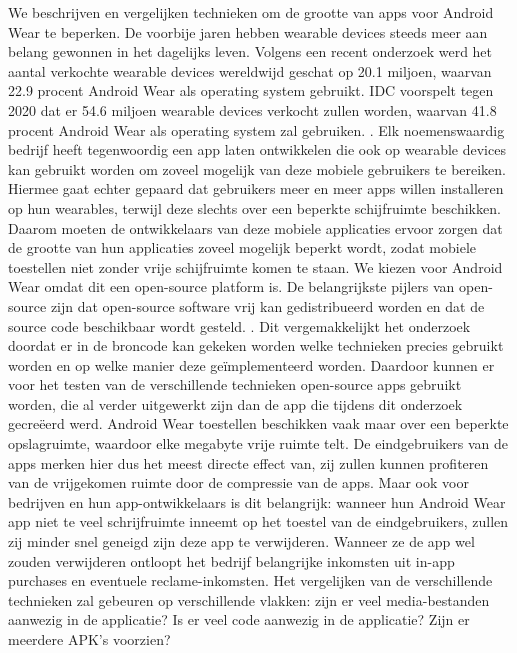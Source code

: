 We beschrijven en vergelijken technieken om de grootte van apps voor Android Wear te beperken. De voorbije jaren hebben wearable devices steeds meer aan belang gewonnen in het dagelijks leven. Volgens een recent onderzoek werd het aantal verkochte wearable devices wereldwijd geschat op 20.1 miljoen, waarvan 22.9 procent Android Wear als operating system gebruikt. IDC voorspelt tegen 2020 dat er 54.6 miljoen wearable devices verkocht zullen worden, waarvan 41.8 procent Android Wear als operating system zal gebruiken. \autocite{IDC}. Elk noemenswaardig bedrijf heeft tegenwoordig een app laten ontwikkelen die ook op wearable devices kan gebruikt worden om zoveel mogelijk van deze mobiele gebruikers te bereiken. Hiermee gaat echter gepaard dat gebruikers meer en meer apps willen installeren op hun wearables, terwijl deze slechts over een beperkte schijfruimte beschikken. Daarom moeten de ontwikkelaars van deze mobiele applicaties ervoor zorgen dat de grootte van hun applicaties zoveel mogelijk beperkt wordt, zodat mobiele toestellen niet zonder vrije schijfruimte komen te staan. We kiezen voor Android Wear omdat dit een open-source platform is. De belangrijkste pijlers van open-source zijn dat open-source software vrij kan gedistribueerd worden en dat de source code beschikbaar wordt gesteld. \autocite{OpenSourceInitiative}. Dit vergemakkelijkt het onderzoek doordat er in de broncode kan gekeken worden welke technieken precies gebruikt worden en op welke manier deze geïmplementeerd worden. Daardoor kunnen er voor het testen van de verschillende technieken open-source apps gebruikt worden, die al verder uitgewerkt zijn dan de app die tijdens dit onderzoek gecreëerd werd. Android Wear toestellen beschikken vaak maar over een beperkte opslagruimte, waardoor elke megabyte vrije ruimte telt. De eindgebruikers van de apps merken hier dus het meest directe effect van, zij zullen kunnen profiteren van de vrijgekomen ruimte door de compressie van de apps. Maar ook voor bedrijven en hun app-ontwikkelaars is dit belangrijk: wanneer hun Android Wear app niet te veel schrijfruimte inneemt op het toestel van de eindgebruikers, zullen zij minder snel geneigd zijn deze app te verwijderen. Wanneer ze de app wel zouden verwijderen ontloopt het bedrijf belangrijke inkomsten uit in-app purchases en eventuele reclame-inkomsten. Het vergelijken van de verschillende technieken zal gebeuren op verschillende vlakken: zijn er veel media-bestanden aanwezig in de applicatie? Is er veel code aanwezig in de applicatie? Zijn er meerdere APK's voorzien?

